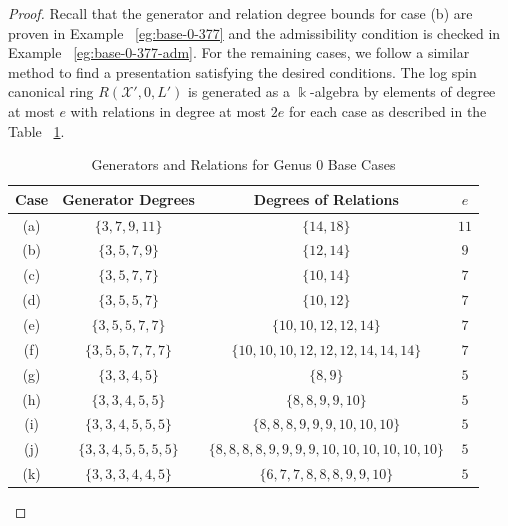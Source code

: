 \documentclass{amsart}
\theoremstyle{plain}
\theoremstyle{definition}
\theoremstyle{remark}
\numberwithin{equation}{section}
\newcommand\Bk{{\Bbbk}}
\newcommand\sx{\mathscr X}
\begin{document}
\begin{proof}
Recall that the generator and relation degree bounds for case (b)
are proven in Example ~\ref{eg:base-0-377} and the admissibility
condition is checked in Example ~\ref{eg:base-0-377-adm}. For
the remaining cases, we follow a similar method to find a
presentation satisfying the desired conditions. The log spin
canonical ring $R(\sx', 0, L')$ is generated as a $\Bk$-algebra by
elements of degree at most $e$ with relations in degree at most $2e$
for each case as described in the Table
~\ref{table:g-0-base-cases-degrees}.
\begin{table}
\begin{tabular}
	{| c || c | c | c |}
	\hline
	Case & Generator Degrees & Degrees of Relations & $e$\\
	\hline
	\hline

	(a) & $\{3, 7, 9, 11\}$ & $\{14, 18\}$ & $11$ \\	\hline

	(b) & $\{3, 5, 7, 9\}$ & $\{12, 14\}$ & $9$ \\ \hline

	(c) & $\{3, 5, 7, 7\}$ & $\{10, 14\}$ & $7$ \\ \hline
	
	(d) & $\{3, 5, 5, 7\}$ & $\{10, 12\}$	& $7$ \\ \hline
	
	(e) & $\{3, 5, 5, 7, 7\}$ & $\{10, 10, 12, 12, 14\}$	& $7$ \\ \hline
	
	(f) & $\{3, 5, 5, 7, 7, 7\}$ & $\{10, 10, 10, 12, 12, 12, 14, 14, 14\}$	& $7$ \\ \hline

	(g) & $\{3, 3, 4, 5\}$ & $\{8, 9\}$ & $5$ \\ \hline
	
	(h) & $\{3, 3, 4, 5, 5\}$ & $\{8, 8, 9, 9, 10\}$ & $5$ \\ \hline
	
	(i) & $\{3, 3, 4, 5, 5, 5\}$ &
	$\{8, 8, 8, 9, 9, 9, 10, 10, 10\}$ & $5$ \\ \hline
	
	(j) & $\{3, 3, 4, 5, 5, 5, 5\}$ &
	$\{8, 8, 8, 8, 9, 9, 9, 9, 10, 10, 10, 10, 10, 10\}$ & $5$ \\ \hline

	(k) &	$\{3, 3, 3, 4, 4, 5\}$ & $\{6, 7, 7, 8, 8, 8, 9, 9, 10\}$ & $5$ \\ \hline
\end{tabular}

\caption{Generators and Relations for Genus 0 Base Cases}
\label{table:g-0-base-cases-degrees}
\end{table}


\end{proof}
\end{document}
